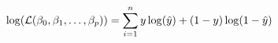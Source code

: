 \documentclass[preview]{standalone}
\begin{document}
\begin{align*}
\special{dvisvgm:raw <g id='unique000'>}\log(\mathcal{L}(\beta_0, \beta_1, \dots, \beta_p))=\sum^n_{i=1}y\log(\hat{y})+(1-y)\log(1-\hat{y})\special{dvisvgm:raw </g>}
\end{align*}
\end{document}
